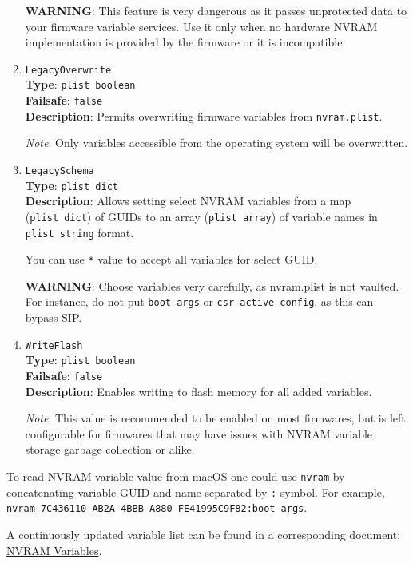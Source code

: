 \documentclass[]{article}
\begin{document}
\begin{enumerate}
  \textbf{WARNING}: This feature is very dangerous as it passes unprotected data to your
  firmware variable services. Use it only when no hardware NVRAM implementation is provided
  by the firmware or it is incompatible.

\item
  \texttt{LegacyOverwrite}\\
  \textbf{Type}: \texttt{plist\ boolean}\\
  \textbf{Failsafe}: \texttt{false}\\
  \textbf{Description}: Permits overwriting firmware variables from \texttt{nvram.plist}.

  \emph{Note}: Only variables accessible from the operating system will be overwritten.

\item
  \texttt{LegacySchema}\\
  \textbf{Type}: \texttt{plist\ dict}\\
  \textbf{Description}: Allows setting select NVRAM variables from a map
  (\texttt{plist\ dict}) of GUIDs to an array (\texttt{plist\ array}) of
  variable names in \texttt{plist\ string} format.

  You can use \texttt{*} value to accept all variables for select GUID.

  \textbf{WARNING}: Choose variables very carefully, as nvram.plist is not vaulted.
  For instance, do not put \texttt{boot-args} or \texttt{csr-active-config}, as
  this can bypass SIP.

\item
  \texttt{WriteFlash}\\
  \textbf{Type}: \texttt{plist\ boolean}\\
  \textbf{Failsafe}: \texttt{false}\\
  \textbf{Description}: Enables writing to flash memory for all added variables.

  \emph{Note}: This value is recommended to be enabled on most firmwares, but is
  left configurable for firmwares that may have issues with NVRAM variable storage
  garbage collection or alike.

\end{enumerate}

To read NVRAM variable value from macOS one could use \texttt{nvram}
by concatenating variable GUID and name separated by \texttt{:} symbol.
For example, \texttt{nvram 7C436110-AB2A-4BBB-A880-FE41995C9F82:boot-args}.

A continuously updated variable list can be found in a corresponding document:
\href{https://docs.google.com/spreadsheets/d/1HTCBwfOBkXsHiK7os3b2CUc6k68axdJYdGl-TyXqLu0}{NVRAM Variables}.
\end{document}
